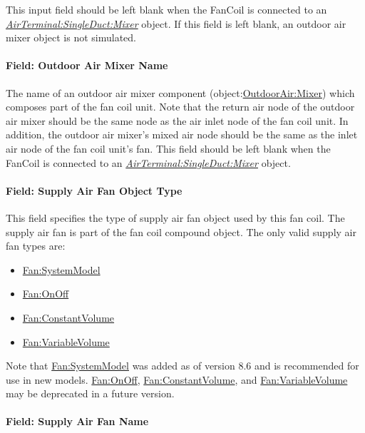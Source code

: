 This input field should be left blank when the FanCoil is connected to an \textit{\hyperref[airterminalsingleductmixer]{AirTerminal:SingleDuct:Mixer}} object. If this field is left blank, an outdoor air mixer object is not simulated.

\paragraph{Field: Outdoor Air Mixer Name}\label{field-outdoor-air-mixer-name-000}

The name of an outdoor air mixer component (object:\hyperref[outdoorairmixer]{OutdoorAir:Mixer}) which composes part of the fan coil unit. Note that the return air node of the outdoor air mixer should be the same node as the air inlet node of the fan coil unit. In addition, the outdoor air mixer's mixed air node should be the same as the inlet air node of the fan coil unit's fan. This field should be left blank when the FanCoil is connected to an \textit{\hyperref[airterminalsingleductmixer]{AirTerminal:SingleDuct:Mixer}} object.

\paragraph{Field: Supply Air Fan Object Type}\label{field-supply-air-fan-object-type-000}

This field specifies the type of supply air fan object used by this fan coil. The supply air fan is part of the fan coil compound object. The only valid supply air fan types are:

\begin{itemize}
\item
  \hyperref[fansystemmodel]{Fan:SystemModel}
\item
  \hyperref[fanonoff]{Fan:OnOff}
\item
  \hyperref[fanconstantvolume]{Fan:ConstantVolume}
\item
  \hyperref[fanvariablevolume]{Fan:VariableVolume}
\end{itemize}

Note that \hyperref[fansystemmodel]{Fan:SystemModel} was added as of version 8.6 and is recommended for use in new models.  \hyperref[fanonoff]{Fan:OnOff}, \hyperref[fanconstantvolume]{Fan:ConstantVolume}, and \hyperref[fanvariablevolume]{Fan:VariableVolume} may be deprecated in a future version.

\paragraph{Field: Supply Air Fan Name}\label{field-supply-air-fan-name-000}

